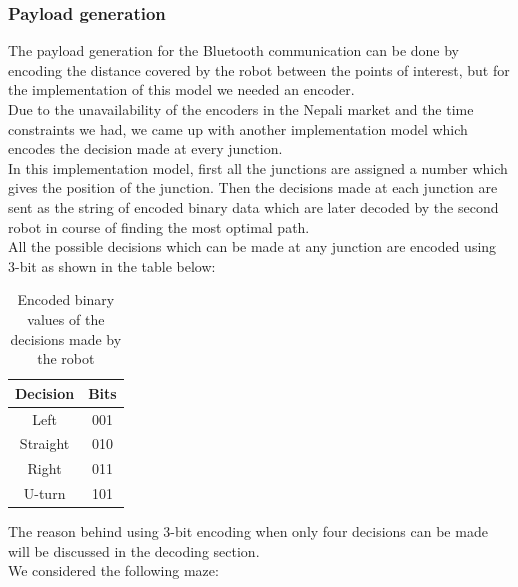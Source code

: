 \subsubsection{Payload generation}
The payload generation for the Bluetooth communication can be done by encoding the distance covered by the robot between the points of interest, but for the implementation of this model we needed an encoder.\\
Due to the unavailability of the encoders in the Nepali market and the time constraints we had, we came up with another implementation model which encodes the decision made at every junction.\\
In this implementation model, first all the junctions are assigned a number which gives the position of the junction. Then the decisions made at each junction are sent as the string of encoded binary data which are later decoded by the second robot in course of finding the most optimal path.\\
All the possible decisions which can be made at any junction are encoded using 3-bit as shown in the table below:\\
\begin{table}[h]
\begin{center}
\begin{tabular}{ |c|c| }
\hline 
Decision&	Bits\\
\hline
Left	&001\\
\hline
Straight&	010\\
\hline
Right	&011\\
\hline
U-turn	&101\\
\hline
\end{tabular}
\caption{Encoded binary values of the decisions made by the robot}
\end{center}
\end{table}
\justify The reason behind using 3-bit encoding when only four decisions can be made will be discussed in the decoding section.\\
We considered the following maze:
\newpage
